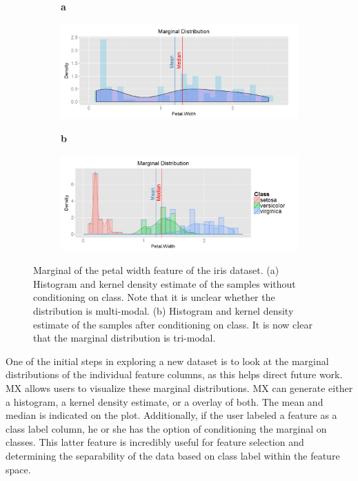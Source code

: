 \documentclass[12pt]{article}
\begin{document}
\begin{figure}[t!]
	\centering
	\begin{subfigure}[t]{0.01\textwidth}
		\textbf{a}
	\end{subfigure}
	\begin{subfigure}[t]{0.48\textwidth}
		\includegraphics[width=\textwidth,valign=t]{Figures/Iris/MarginalPetalWidthnocond.png}
		\subcaption{}
		\label{fig:FigMarginalNoCond}
	\end{subfigure}\hfill
	\begin{subfigure}[t]{0.01\textwidth}
		\textbf{b}
	\end{subfigure}
	\begin{subfigure}[t]{0.48\textwidth}
		\includegraphics[width=\textwidth,valign=t]{Figures/Iris/MarginalPetalWidth.png}
		\subcaption{}
		\label{fig:FigMarginal}
	\end{subfigure}
	\vspace{-1.5\baselineskip}
	\caption{Marginal of the petal width feature of the iris dataset. (a) Histogram and kernel density estimate of the samples without conditioning on class. Note that it is unclear whether the distribution is multi-modal. (b) Histogram and kernel density estimate of the samples after conditioning on class. It is now clear that the marginal distribution is tri-modal.}
	\label{fig:FigSample}
\end{figure}

One of the initial steps in exploring a new dataset is to look at the marginal distributions of the individual feature columns, as this helps direct future work. MX allows users to visualize these marginal distributions. MX can generate either a histogram, a kernel density estimate, or a overlay of both. The mean and median is indicated on the plot. Additionally, if the user labeled a feature as a class label column, he or she has the option of conditioning the marginal on classes. This latter feature is incredibly useful for feature selection and determining the separability of the data based on class label within the feature space.
\end{document}
